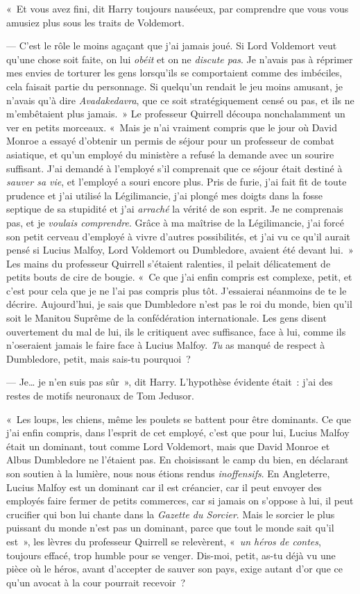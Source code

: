 «~Et vous avez fini, dit Harry toujours nauséeux, par comprendre que vous vous amusiez plus sous les traits de Voldemort.

--- C'est le rôle le moins agaçant que j'ai jamais joué.
Si Lord Voldemort veut qu'une chose soit faite, on lui \emph{obéit} et on ne \emph{discute pas}.
Je n'avais pas à réprimer mes envies de torturer les gens lorsqu'ils se comportaient comme des imbéciles, cela faisait partie du personnage.
Si quelqu'un rendait le jeu moins amusant, je n'avais qu'à dire \emph{Avadakedavra}, que ce soit stratégiquement censé ou pas, et ils ne m'embêtaient plus jamais.~»
Le professeur Quirrell découpa nonchalamment un ver en petits morceaux.
«~Mais je n'ai vraiment compris que le jour où David Monroe a essayé d'obtenir un permis de séjour pour un professeur de combat asiatique, et qu'un employé du ministère a refusé la demande avec un sourire suffisant.
J'ai demandé à l'employé s'il comprenait que ce séjour était destiné à \emph{sauver sa vie}, et l'employé a souri encore plus.
Pris de furie, j'ai fait fit de toute prudence et j'ai utilisé la Légilimancie, j'ai plongé mes doigts dans la fosse septique de sa stupidité et j'ai \emph{arraché} la vérité de son esprit.
Je ne comprenais pas, et je \emph{voulais comprendre}.
Grâce à ma maîtrise de la Légilimancie, j'ai forcé son petit cerveau d'employé à vivre d'autres possibilités, et j'ai vu ce qu'il aurait pensé si Lucius Malfoy, Lord Voldemort ou Dumbledore, avaient été devant lui.~»
Les mains du professeur Quirrell s'étaient ralenties, il pelait délicatement de petits bouts de cire de bougie.
«~Ce que j'ai enfin compris est complexe, petit, et c'est pour cela que je ne l'ai pas compris plus tôt.
J'essaierai néanmoins de te le décrire.
Aujourd'hui, je sais que Dumbledore n'est pas le roi du monde, bien qu'il soit le Manitou Suprême de la confédération internationale.
Les gens disent ouvertement du mal de lui, ils le critiquent avec suffisance, face à lui, comme ils n'oseraient jamais le faire face à Lucius Malfoy.
\emph{Tu} as manqué de respect à Dumbledore, petit, mais sais-tu pourquoi~?

--- Je… je n'en suis pas sûr~», dit Harry.
L'hypothèse évidente était~: j'ai des restes de motifs neuronaux de Tom Jedusor.

«~Les loups, les chiens, même les poulets se battent pour être dominants.
Ce que j'ai enfin compris, dans l'esprit de cet employé, c'est que pour lui, Lucius Malfoy était un dominant, tout comme Lord Voldemort, mais que David Monroe et Albus Dumbledore ne l'étaient pas.
En choisissant le camp du bien, en déclarant son soutien à la lumière, nous nous étions rendus \emph{inoffensifs}.
En Angleterre, Lucius Malfoy est un dominant car il est créancier, car il peut envoyer des employés faire fermer de petits commerces, car si jamais on s'oppose à lui, il peut crucifier qui bon lui chante dans la \emph{Gazette du Sorcier}.
Mais le sorcier le plus puissant du monde n'est pas un dominant, parce que tout le monde sait qu'il est~», les lèvres du professeur Quirrell se relevèrent, «~\emph{un héros de contes}, toujours effacé, trop humble pour se venger.
Dis-moi, petit, as-tu déjà vu une pièce où le héros, avant d'accepter de sauver son pays, exige autant d'or que ce qu'un avocat à la cour pourrait recevoir~?

